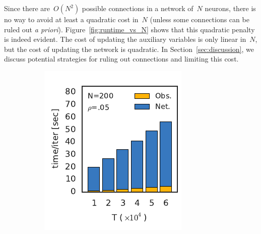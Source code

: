 Since there are~$O(N^2)$ possible connections in a network of~$N$
neurons, there is no way to avoid at least a quadratic cost
in~$N$ (unless some connections can be ruled out \textit{a priori}).
Figure~\ref{fig:runtime_vs_N} shows that this quadratic penalty is
indeed evident. The cost of updating the auxiliary variables is only
linear in~$N$, but the cost of updating the network is quadratic. In
Section~\ref{sec:discussion}, we discuss potential strategies for
ruling out connections and limiting this cost.


\begin{figure}[t!]
  \centering
  \vspace{-.2in}
  \begin{subfigure}[b]{1.81in}
    \centering
    \caption{}
    \vspace{-.25in}
    \includegraphics[width=\textwidth]{figures/ch5/runtime_vs_T.pdf}
    \label{fig:runtime_vs_T}
  \end{subfigure}
  ~
  \begin{subfigure}[b]{2.17in}
    \centering
    \caption{}
    \vspace{-.25in}

\end{subfigure}
\end{figure}
